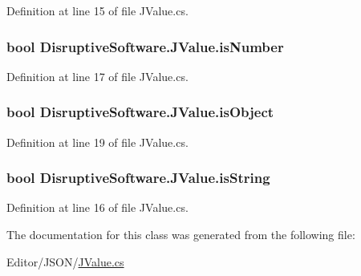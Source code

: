 Definition at line 15 of file J\+Value.\+cs.

\hypertarget{class_disruptive_software_1_1_j_value_a224d2489aea8ffc065178f0d427128c8}{
\subsubsection[{is\+Number}]{\setlength{\rightskip}{0pt plus 5cm}bool Disruptive\+Software.\+J\+Value.\+is\+Number\hspace{0.3cm}{\ttfamily [get]}}}\label{class_disruptive_software_1_1_j_value_a224d2489aea8ffc065178f0d427128c8}


Definition at line 17 of file J\+Value.\+cs.

\hypertarget{class_disruptive_software_1_1_j_value_a27b4b9ce3e878a99538aac974d65f00d}{
\subsubsection[{is\+Object}]{\setlength{\rightskip}{0pt plus 5cm}bool Disruptive\+Software.\+J\+Value.\+is\+Object\hspace{0.3cm}{\ttfamily [get]}}}\label{class_disruptive_software_1_1_j_value_a27b4b9ce3e878a99538aac974d65f00d}


Definition at line 19 of file J\+Value.\+cs.

\hypertarget{class_disruptive_software_1_1_j_value_a0b90970ea57c7640138d7c4d8d23566c}{
\subsubsection[{is\+String}]{\setlength{\rightskip}{0pt plus 5cm}bool Disruptive\+Software.\+J\+Value.\+is\+String\hspace{0.3cm}{\ttfamily [get]}}}\label{class_disruptive_software_1_1_j_value_a0b90970ea57c7640138d7c4d8d23566c}


Definition at line 16 of file J\+Value.\+cs.



The documentation for this class was generated from the following file\+:\begin{DoxyCompactItemize}
\item 
Editor/\+J\+S\+O\+N/\hyperlink{_j_value_8cs}{J\+Value.\+cs}\end{DoxyCompactItemize}
